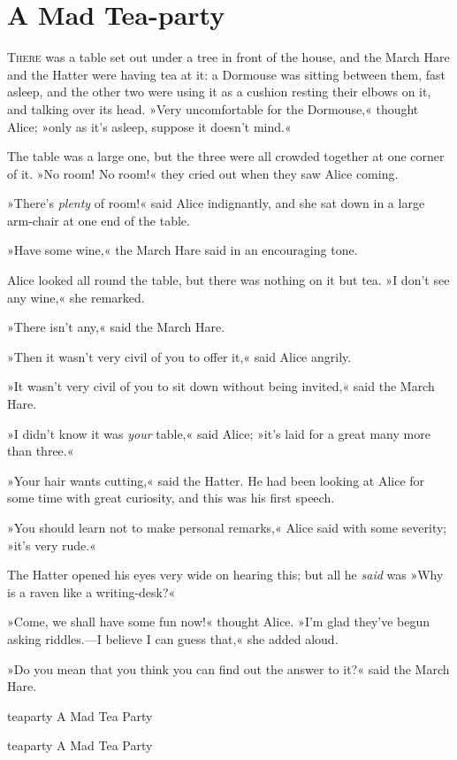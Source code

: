 \chapter{A Mad Tea-party}

\lettrine[lines=4,findent=2pt]{T}{here} was a table set out under a tree in front of the house, and the March Hare and the Hatter were having tea at it: a Dormouse was sitting between them, fast asleep, and the other two were using it as a cushion resting their elbows on it, and talking over its head. »Very uncomfortable for the Dormouse,« thought Alice; »only as it's asleep, suppose it doesn't mind.«

The table was a large one, but the three were all crowded together at one corner of it. »No room! No room!« they cried out when they saw Alice coming.

»There's \textit{plenty} of room!« said Alice indignantly, and she sat down in a large arm-chair at one end of the table.

»Have some wine,« the March Hare said in an encouraging tone.

Alice looked all round the table, but there was nothing on it but tea. »I don't see any wine,« she remarked.

»There isn't any,« said the March Hare.

»Then it wasn't very civil of you to offer it,« said Alice angrily.

»It wasn't very civil of you to sit down without being invited,« said the March Hare.

»I didn't know it was \textit{your} table,« said Alice; »it's laid for a great many more than three.«

»Your hair wants cutting,« said the Hatter. He had been looking at Alice for some time with great curiosity, and this was his first speech.

»You should learn not to make personal remarks,« Alice said with some severity; »it's very rude.«

The Hatter opened his eyes very wide on hearing this; but all he \textit{said} was »Why is a raven like a writing-desk?«

»Come, we shall have some fun now!« thought Alice. »I'm glad they've begun asking riddles.—I believe I can guess that,« she added aloud.

»Do you mean that you think you can find out the answer to it?« said the March Hare.

\begin{pictures}
	\begin{letter}
		\begin{colorbigpic}
			[1.2]
			{teaparty}
			{A Mad Tea Party}
		\end{colorbigpic}
	\end{letter}
	
	\begin{a4}
		\begin{colorbigpic}
			[1.0]
			{teaparty}
			{A Mad Tea Party}
		\end{colorbigpic}
	\end{a4}	
\end{pictures}


